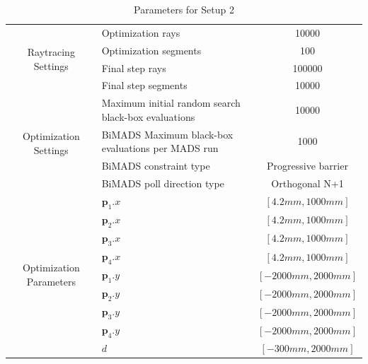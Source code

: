 \documentclass[a4paper,10pt]{article}
\renewcommand{\vec}[1]{\mathbf{#1}}
\begin{document}
    \begin{table}
    \centering
    \setlength\tabcolsep{8pt}
    \renewcommand{\arraystretch}{1.5}
    \begin{tabular}{| c | p{40mm} | c |}
        \hline
        \multirow{4}{*}{Raytracing Settings} & Optimization rays & 10000 \\
        \cline{2-3}
        & Optimization segments & 100 \\
        \cline{2-3}
        & Final step rays & 100000 \\
        \cline{2-3}
        & Final step segments & 10000 \\
        \hline
        \multirow{4}{*}{Optimization Settings} & Maximum initial random search black-box evaluations & 10000 \\
        \cline{2-3}
        & BiMADS Maximum black-box evaluations per MADS run & 1000 \\
        \cline{2-3}
        & BiMADS constraint type & Progressive barrier \\
        \cline{2-3}
        & BiMADS poll direction type & Orthogonal N+1 \\
        \hline
        \multirow{9}{*}{Optimization Parameters} & 
        $\vec{p}_1.x$ & $[4.2mm, 1000mm]$ \\
        \cline{2-3}
        & $\vec{p}_2.x$ & $[4.2mm, 1000mm]$\\
        \cline{2-3}
        & $\vec{p}_3.x$ & $[4.2mm, 1000mm]$\\ 
        \cline{2-3}
        & $\vec{p}_4.x$ & $[4.2mm, 1000mm]$\\ 
        \cline{2-3}
        & $\vec{p}_1.y$ & $[-2000mm, 2000mm]$ \\
        \cline{2-3}
        & $\vec{p}_2.y$ & $[-2000mm, 2000mm]$\\
        \cline{2-3}
        & $\vec{p}_3.y$ & $[-2000mm, 2000mm]$\\ 
        \cline{2-3}
        & $\vec{p}_4.y$ & $[-2000mm, 2000mm]$\\ 
        \cline{2-3}
        & $d$ & $[-300mm, 2000mm]$\\ 
        \hline 
    \end{tabular}
    \caption{Parameters for Setup 2}
    \end{table}
\end{document}
